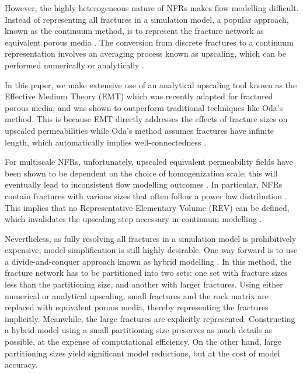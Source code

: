 \documentclass[draft]{agujournal2018}
\begin{document}
However, the highly heterogeneous nature of NFRs makes flow modelling difficult. Instead of representing all fractures in a simulation model, a popular approach, known as the continuum method, is to represent the fracture network as equivalent porous media \citep{Berre2018, Ezulike2013, Lemonnier2010a, Lemonnier2010, Warren1963, Yan2016}. The conversion from discrete fractures to a continuum representation involves an averaging process known as upscaling, which can be performed numerically or analytically \citep{Durlofsky1991,Oda1985,Renard1997,Saevik2013}. 

In this paper, we make extensive use of an analytical upscaling tool known as the Effective Medium Theory (EMT) which was recently adapted for fractured porous media, and was shown to outperform traditional techniques like Oda's method. This is because EMT directly addresses the effects of fracture sizes on upscaled permeabilities while Oda's method assumes fractures have infinite length, which automatically implies well-connectedness \citep{Oda1985, Saevik2013, Saevik2014}.

For multiscale NFRs, unfortunately, upscaled equivalent permeability fields have been shown to be dependent on the choice of homogenization scale; this will eventually lead to inconsistent flow modelling outcomes \citep{Elfeel2013}. In particular, NFRs contain fractures with various sizes that often follow a power law distribution \citep{Bonnet2001}. This implies that no Representative Elementary Volume (REV) can be defined, which invalidates the upscaling step necessary in continuum modelling \citep{Berkowitz2002}.

Nevertheless, as fully resolving all fractures in a simulation model is prohibitively expensive, model simplification is still highly desirable. One way forward is to use a divide-and-conquer approach known as hybrid modelling \citep{Berkowitz2002, Bourbiaux2010}. In this method, the fracture network has to be partitioned into two sets: one set with fracture sizes less than the partitioning size, and another with larger fractures. Using either numerical or analytical upscaling, small fractures and the rock matrix are replaced with equivalent porous media, thereby representing the fractures implicitly. Meanwhile, the large fractures are explicitly represented. Constructing a hybrid model using a small partitioning size preserves as much details as possible, at the expense of computational efficiency. On the other hand, large partitioning sizes yield significant model reductions, but at the cost of model accuracy.
\end{document}
